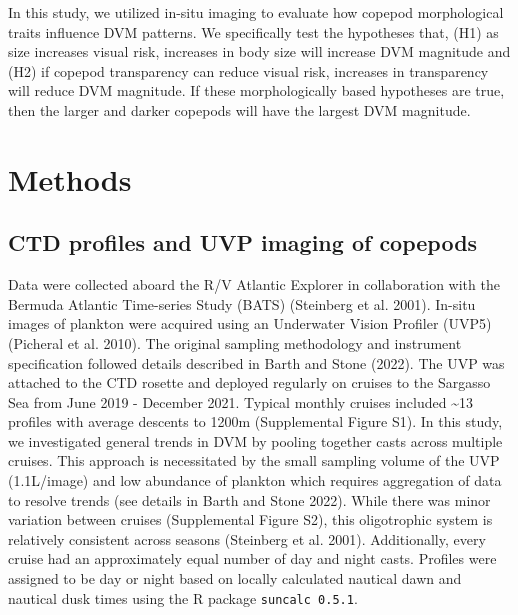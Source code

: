 \documentclass[
]{article}
\begin{document}
In this study, we utilized in-situ imaging to evaluate how copepod
morphological traits influence DVM patterns. We specifically test the
hypotheses that, (H1) as size increases visual risk, increases in body
size will increase DVM magnitude and (H2) if copepod transparency can
reduce visual risk, increases in transparency will reduce DVM magnitude.
If these morphologically based hypotheses are true, then the larger and
darker copepods will have the largest DVM magnitude.

\hypertarget{methods}{%
\section{Methods}\label{methods}}

\hypertarget{ctd-profiles-and-uvp-imaging-of-copepods}{%
\subsection{CTD profiles and UVP imaging of
copepods}\label{ctd-profiles-and-uvp-imaging-of-copepods}}

Data were collected aboard the R/V Atlantic Explorer in collaboration
with the Bermuda Atlantic Time-series Study (BATS) (Steinberg et al.
2001). In-situ images of plankton were acquired using an Underwater
Vision Profiler (UVP5) (Picheral et al. 2010). The original sampling
methodology and instrument specification followed details described in
Barth and Stone (2022). The UVP was attached to the CTD rosette and
deployed regularly on cruises to the Sargasso Sea from June 2019 -
December 2021. Typical monthly cruises included \textasciitilde13
profiles with average descents to 1200m (Supplemental Figure S1). In
this study, we investigated general trends in DVM by pooling together
casts across multiple cruises. This approach is necessitated by the
small sampling volume of the UVP (1.1L/image) and low abundance of
plankton which requires aggregation of data to resolve trends (see
details in Barth and Stone 2022). While there was minor variation
between cruises (Supplemental Figure S2), this oligotrophic system is
relatively consistent across seasons (Steinberg et al. 2001).
Additionally, every cruise had an approximately equal number of day and
night casts. Profiles were assigned to be day or night based on locally
calculated nautical dawn and nautical dusk times using the R package
\texttt{suncalc\ 0.5.1}.
\end{document}
